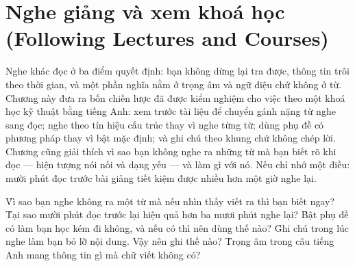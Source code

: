 \documentclass[../../english.tex]{subfiles}
\begin{document}
\chapter{Nghe giảng và xem khoá học (Following Lectures and Courses)}

\begin{tomtat}
Nghe khác đọc ở ba điểm quyết định: bạn không dừng lại tra được, thông tin trôi theo thời gian, và một phần nghĩa nằm ở trọng âm và ngữ điệu chứ không ở từ. Chương này đưa ra bốn chiến lược đã được kiểm nghiệm cho việc theo một khoá học kỹ thuật bằng tiếng Anh: xem trước tài liệu để chuyển gánh nặng từ nghe sang đọc; nghe theo tín hiệu cấu trúc thay vì nghe từng từ; dùng phụ đề có phương pháp thay vì bật mặc định; và ghi chú theo khung chứ không chép lời. Chương cũng giải thích vì sao bạn không nghe ra những từ mà bạn biết rõ khi đọc --- hiện tượng nói nối và dạng yếu --- và làm gì với nó. Nếu chỉ nhớ một điều: mười phút đọc trước bài giảng tiết kiệm được nhiều hơn một giờ nghe lại.
\end{tomtat}

\begin{nentang}
\end{nentang}

\begin{khoigoi}
\h{Vì sao bạn nghe không ra một từ mà nếu nhìn thấy viết ra thì bạn biết ngay?}
\h{Tại sao mười phút đọc trước lại hiệu quả hơn ba mươi phút nghe lại?}
\h{Bật phụ đề có làm bạn học kém đi không, và nếu có thì nên dùng thế nào?}
\h{Ghi chú trong lúc nghe làm bạn bỏ lỡ nội dung. Vậy nên ghi thế nào?}
\h{Trọng âm trong câu tiếng Anh mang thông tin gì mà chữ viết không có?}
\end{khoigoi}
\end{document}
